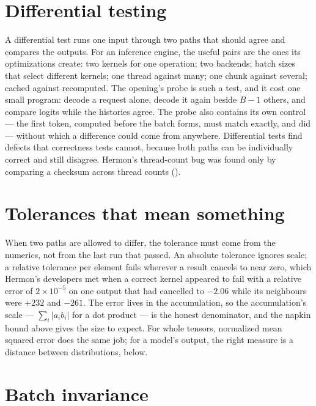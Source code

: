 \section{Differential testing}

A differential test runs one input through two paths that should agree and
compares the outputs. For an inference engine, the useful pairs are the ones
its optimizations create: two kernels for one operation; two backends; batch
sizes that select different kernels; one thread against many; one chunk against
several; cached against recomputed. The opening's probe is such a test, and it
cost one small program: decode a request alone, decode it again beside $B - 1$
others, and compare logits while the histories agree. The probe also contains
its own control --- the first token, computed before the batch forms, must match
exactly, and did --- without which a difference could come from anywhere.
Differential tests find defects that correctness tests cannot, because both
paths can be individually correct and still disagree. Hermon's thread-count bug
was found only by comparing a checksum across thread counts
().

\section{Tolerances that mean something}

When two paths are allowed to differ, the tolerance must come from the
numerics, not from the last run that passed. An absolute tolerance ignores
scale; a relative tolerance per element fails wherever a result cancels to near
zero, which Hermon's developers met when a correct kernel appeared to fail with
a relative error of $2 \times 10^{-5}$ on one output that had cancelled to
$-2.06$ while its neighbours were $+232$ and $-261$. The
error lives in the accumulation, so the accumulation's scale --- $\sum_i
\lvert a_i b_i\rvert$ for a dot product --- is the honest denominator, and the
napkin bound above gives the size to expect. For whole tensors, normalized mean
squared error does the same job; for a model's output, the right measure is a
distance between distributions, below.

\section{Batch invariance}

